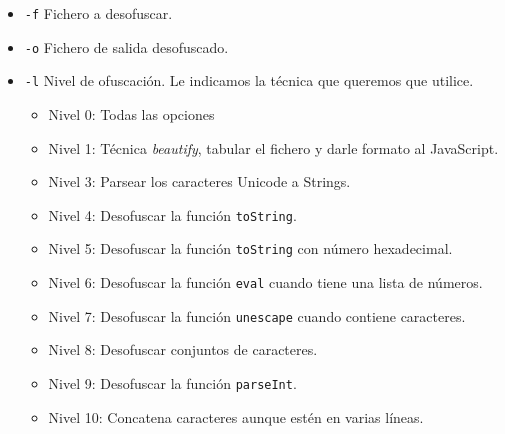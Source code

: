 \documentclass[a4paper]{article}
\begin{document}
	\begin{itemize}
		\item \verb*|-f| Fichero a desofuscar.
		\item \verb*|-o| Fichero de salida desofuscado.
		\item \verb*|-l| Nivel de ofuscación. Le indicamos la técnica que queremos que utilice.
		\begin{itemize}
			\item Nivel 0: Todas las opciones
			\item Nivel 1: Técnica \textit{beautify}, tabular el fichero y darle formato al JavaScript.
			\item Nivel 3: Parsear los caracteres Unicode a Strings.
			\item Nivel 4: Desofuscar la función \verb*|toString|.
			\item Nivel 5: Desofuscar la función  \verb*|toString| con número hexadecimal.
			\item Nivel 6: Desofuscar la función  \verb*|eval| cuando tiene una lista de números.
			\item Nivel 7: Desofuscar la función  \verb*|unescape| cuando contiene caracteres.
			\item Nivel 8: Desofuscar conjuntos de caracteres.
			\item Nivel 9: Desofuscar la función  \verb*|parseInt|.
			\item Nivel 10: Concatena caracteres aunque estén en varias líneas.
		\end{itemize}
	\end{itemize}
\end{document}
